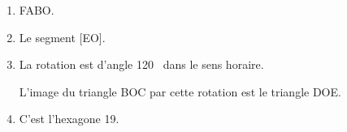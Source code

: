 \documentclass[10pt]{article}
\begin{document}
\begin{enumerate}
	\item  %
	
FABO.
		
		\item %
		Le segment [EO].
		\item  %
		
La rotation est d'angle 120~\degres{} dans le sens horaire.

L'image du triangle BOC par cette rotation est le triangle DOE.
\item C'est l'hexagone 19.
	\end{enumerate}
	
\end{document}
